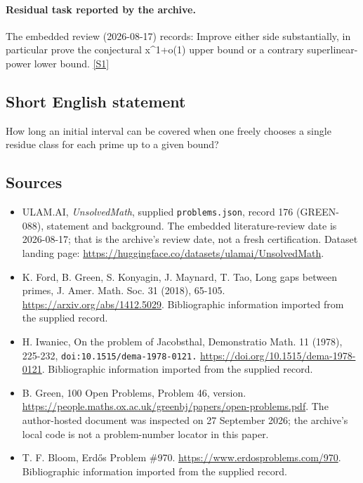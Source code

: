 \documentclass[11pt,a4paper]{article}
\newcommand{\sref}[2]{\hyperlink{source:#1:#2}{[S#2]}}
\begin{document}
\paragraph{Residual task reported by the archive.}

The embedded review (2026-08-17) records: Improve either side substantially, in particular prove the conjectural x\textasciicircum{}{1+o(1)} upper bound or a contrary superlinear-power lower bound. \sref{176}{1}

\subsection{Short English statement}

How long an initial interval can be covered when one freely chooses a single residue class for each prime up to a given bound?

\subsection{Sources}

{\small

\begin{itemize}

\item[\hypertarget{source:176:1}{S1}] ULAM.AI, \emph{UnsolvedMath}, supplied \texttt{problems.json}, record 176 (GREEN-088), statement and background. The embedded literature-review date is 2026-08-17; that is the archive’s review date, not a fresh certification. Dataset landing page: \url{https://huggingface.co/datasets/ulamai/UnsolvedMath}.

\item[\hypertarget{source:176:2}{S2}] K. Ford, B. Green, S. Konyagin, J. Maynard, T. Tao, Long gaps between primes, J. Amer. Math. Soc. 31 (2018), 65-105. \url{https://arxiv.org/abs/1412.5029}. Bibliographic information imported from the supplied record.

\item[\hypertarget{source:176:3}{S3}] H. Iwaniec, On the problem of Jacobsthal, Demonstratio Math. 11 (1978), 225-232, \nolinkurl{doi:10.1515/dema-1978-0121.} \url{https://doi.org/10.1515/dema-1978-0121}. Bibliographic information imported from the supplied record.

\item[\hypertarget{source:176:4}{S4}] B. Green, 100 Open Problems, Problem 46, version. \url{https://people.maths.ox.ac.uk/greenbj/papers/open-problems.pdf}. The author-hosted document was inspected on 27 September 2026; the archive’s local code is not a problem-number locator in this paper.

\item[\hypertarget{source:176:5}{S5}] T. F. Bloom, Erdős Problem \#970. \url{https://www.erdosproblems.com/970}. Bibliographic information imported from the supplied record.

\end{itemize}

}

\label{end:176}
\end{document}
